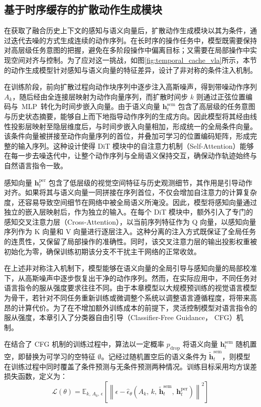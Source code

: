 \subsection{基于时序缓存的扩散动作生成模块}
\label{sec:chap4_diffusion_action}

在获取了融合历史上下文的感知与语义向量后，扩散动作生成模块以其为条件，通过迭代去噪的方式生成连续的动作序列。在长时序的操作任务中，模型既需要保持对高层级任务意图的把握，避免在多阶段操作中偏离目标；又需要在局部操作中实现空间对齐与控制。为了应对这一挑战，如图\ref{fig:temporal_cache_vla}所示，本节的动作生成模型针对感知与语义向量的特征差异，设计了非对称的条件注入机制。

在训练阶段，前向扩散过程向动作块序列中逐步注入高斯噪声，得到带噪动作序列 $A_k$，随后经由全连接层映射为动作向量序列，而扩散时间步 $k$ 则通过正弦位置编码与~MLP~转化为时间步嵌入向量。由于语义向量 $\mathbf{h}^{\text{sem}}_t$ 包含了高层级的任务意图与历史状态摘要，能够自上而下地指导动作序列的生成方向。因此模型将其经由线性投影层映射至隐层维度后，与时间步嵌入向量相加，形成统一的全局条件向量。该条件向量被拼接至动作向量序列的首位，并叠加可学习的位置编码矩阵，形成完整的输入序列。这种设计使得 DiT 模块中的自注意力机制（Self-Attention）能够在每一步去噪迭代中，让整个动作序列与全局语义保持交互，确保动作轨迹始终与自然语言指令一致。

感知向量 $\mathbf{h}^{\text{per}}_t$ 包含了低层级的视觉空间特征与历史观测细节，其作用是引导动作对齐。如果将其与语义向量一同拼接在序列首位，不仅会增加自注意力的计算复杂度，还容易导致空间细节在网络中被全局语义所淹没。因此，模型将感知向量通过独立的嵌入层映射后，作为独立的输入。在每个 DiT 模块中，额外引入了专门的感知交叉注意力层（Cross-Attention），以当前序列特征作为 Q 向量，以感知向量序列作为 K 向量和 V 向量进行逐层注入。这种分离的注入方式既保证了全局任务的连贯性，又保留了局部操作的准确性。同时，该交叉注意力层的输出投影权重被初始化为零，确保训练初期该分支不干扰主干网络的正常收敛。

在上述非对称注入机制下，模型能够在语义向量的全局引导与感知向量的局部校准下，从高斯噪声中逐步恢复出干净的动作序列。然而，在实际应用中，不同任务对语言指令的服从强度要求往往不同。由于本章模型以大规模预训练的视觉语言模型为骨干，若针对不同任务重新训练或微调整个系统以调整语言遵循程度，将带来高昂的计算代价。为了在不增加额外训练成本的前提下，灵活控制模型对语言指令的服从强度，本章引入了分类器自由引导（Classifier-Free Guidance， CFG）\cite{ho2021classifier}机制。

在结合了 CFG 机制的训练过程中，算法以一定概率 $p_{\text{drop}}$ 将语义向量 $\mathbf{h}^{\text{sem}}_t$ 随机置空，即替换为可学习的空特征 $\emptyset$。记经过随机置空后的语义条件为 $\tilde{\mathbf{h}}^{\text{sem}}_t$，则模型在训练过程中同时覆盖了条件预测与无条件预测两种情况。训练目标采用均方误差损失函数，定义为：
\begin{equation}
  \mathcal{L}(\theta) = \mathbb{E}_{k,\, A_0,\, \epsilon}\!\left[\left\| \epsilon - \hat{\epsilon}_\theta(A_k,\, k,\, \tilde{\mathbf{h}}^{\text{sem}}_t,\, \mathbf{h}^{\text{per}}_t) \right\|^2\right]
\end{equation}

